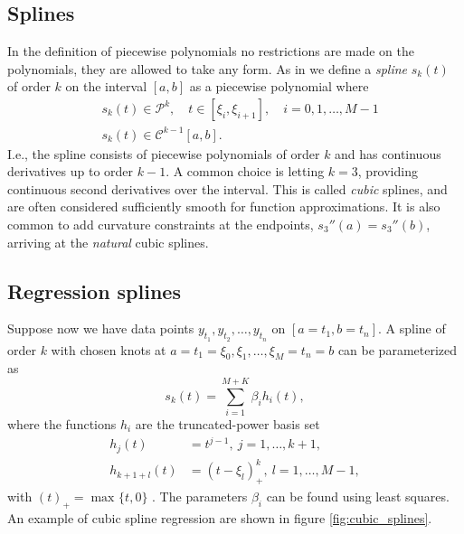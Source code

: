 \documentclass[a4paper]{memoir}
\theoremstyle{plain}
\theoremstyle{definition}
\theoremstyle{remark}
\begin{document}
\subsection{Splines}
In the definition of piecewise polynomials no restrictions are made on the polynomials, they are allowed to take any form.
As in \cite{quarteroni} we define a \textit{spline} $s_k(t)$ of order $k$ on the interval $[a,b]$ as a piecewise polynomial where
\begin{align*}
        &s_k(t) \in \mathcal{P}^k , \quad t \in [\xi_i, \xi_{i+1}],\quad i = 0, 1, \hdots, M-1 \\
        &s_k(t) \in \mathcal{C}^{k - 1}[a, b].
\end{align*}
I.e., the spline consists of piecewise polynomials of order $k$ and has continuous derivatives up to order $k - 1$.
A common choice is letting $k = 3$, providing continuous second derivatives over the interval.
This is called \textit{cubic} splines, and are often considered sufficiently smooth for function approximations.
It is also common to add curvature constraints at the endpoints, $s_3''(a) = s_3''(b)$, arriving at the \textit{natural} cubic splines.

\subsection{Regression splines}
Suppose now we have data points $y_{t_1}, y_{t_2}, \hdots, y_{t_n}$ on $[a = t_1, b = t_n]$. 
A spline of order $k$ with chosen knots at $a = t_1 = \xi_0, \xi_1, \hdots, \xi_{M} = t_n = b$ can be parameterized as 
\begin{equation*}
        s_k(t) = \sum_{i = 1}^{M + K} \beta_i h_i(t),
\end{equation*}
where the functions $h_i$ are the truncated-power basis set
\begin{align*}
        h_j(t) &= t^{j - 1}, \ j = 1, \hdots, k+1, \\
        h_{k+1+l}(t) &= (t - \xi_l)_+^k, \ l = 1, \hdots, M-1,
\end{align*}
with $(t)_+ = \max_{} \{ t, 0 \}$ \cite{hastie}.
The parameters $\beta_i$ can be found using least squares.
An example of cubic spline regression are shown in figure \ref{fig:cubic_splines}.
\end{document}
